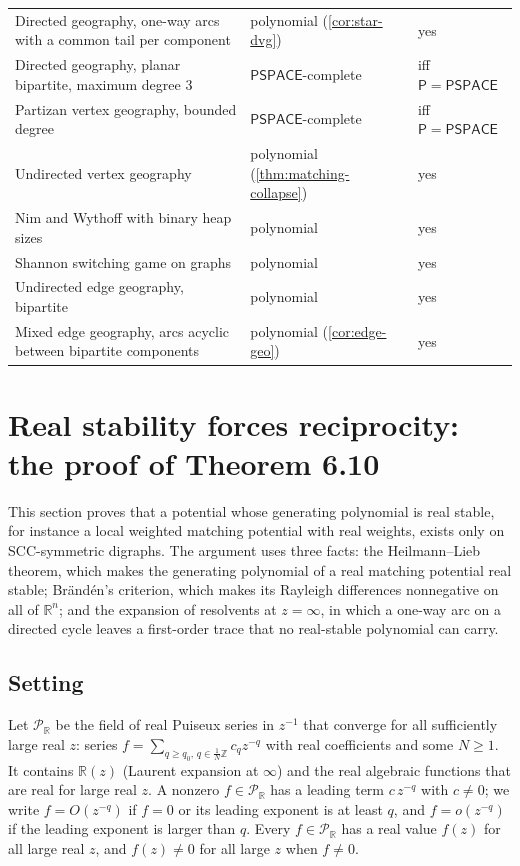 \documentclass[11pt]{amsart}
\theoremstyle{plain}
\theoremstyle{definition}
\theoremstyle{remark}
\numberwithin{equation}{section}
\newcommand{\ZZ}{\mathbb{Z}}
\newcommand{\RR}{\mathbb{R}}
\newcommand{\Rz}{\RR(z)}
\newcommand{\Puis}{\mathcal{P}_{\RR}}
\newcommand{\cls}[1]{\mathsf{#1}}
\newcommand{\PSPACE}{\cls{PSPACE}}
\newcommand{\Pclass}{\cls{P}}
\begin{document}
\begin{center}
\begin{longtable}{@{}L{0.36}L{0.32}L{0.25}@{}}
Directed geography, one-way arcs with a common tail per component & polynomial (\cref{cor:star-dvg}) & yes\\
Directed geography, planar bipartite, maximum degree $3$ & $\PSPACE$-complete & iff $\Pclass=\PSPACE$\\
Partizan vertex geography, bounded degree & $\PSPACE$-complete & iff $\Pclass=\PSPACE$\\
Undirected vertex geography & polynomial (\cref{thm:matching-collapse}) & yes\\
Nim and Wythoff with binary heap sizes & polynomial \cite{Bouton,Wythoff} & yes\\
Shannon switching game on graphs & polynomial \cite{Lehman,EdmondsPartition} & yes\\
Undirected edge geography, bipartite & polynomial \cite{FSU} & yes\\
Mixed edge geography, arcs acyclic between bipartite components & polynomial (\cref{cor:edge-geo}) & yes\\
\bottomrule
\end{longtable}
\end{center}

\section{Real stability forces reciprocity: the proof of Theorem 6.10}\label{sec:realstab}

This section proves that a potential whose generating polynomial is real stable, for instance a local weighted matching potential with real weights, exists only on SCC-symmetric digraphs. The argument uses three facts: the Heilmann--Lieb theorem, which makes the generating polynomial of a real matching potential real stable; Br\"and\'en's criterion, which makes its Rayleigh differences nonnegative on all of $\RR^n$; and the expansion of resolvents at $z=\infty$, in which a one-way arc on a directed cycle leaves a first-order trace that no real-stable polynomial can carry.

\subsection{Setting}\label{ssec:real-setting}
Let $\Puis$ be the field of real Puiseux series in $z^{-1}$ that converge for all sufficiently large real $z$: series $f=\sum_{q\ge q_0,\,q\in\frac1N\ZZ}c_qz^{-q}$ with real coefficients and some $N\ge1$. It contains $\Rz$ (Laurent expansion at $\infty$) and the real algebraic functions that are real for large real $z$. A nonzero $f\in\Puis$ has a leading term $c\,z^{-q}$ with $c\neq0$; we write $f=O(z^{-q})$ if $f=0$ or its leading exponent is at least $q$, and $f=o(z^{-q})$ if the leading exponent is larger than $q$. Every $f\in\Puis$ has a real value $f(z)$ for all large real $z$, and $f(z)\neq0$ for all large $z$ when $f\ne0$.
\end{document}
